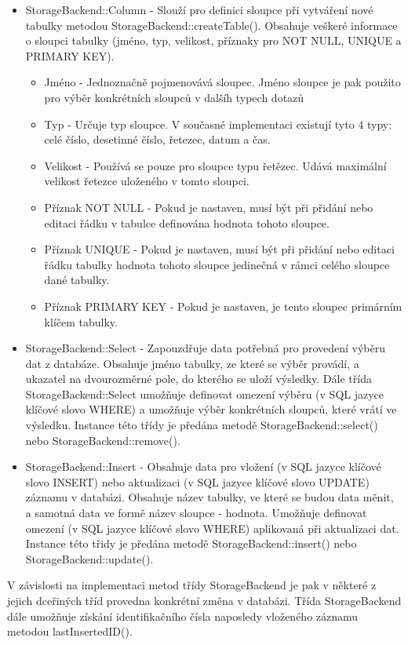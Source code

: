 \begin{itemize}
\item StorageBackend::Column - Slouží pro definici sloupce při vytváření nové tabulky metodou StorageBackend::createTable().
Obsahuje veškeré informace o sloupci tabulky (jméno, typ, velikost,
příznaky pro NOT NULL, UNIQUE a PRIMARY KEY). %
\begin{itemize}
\item Jméno - Jednoznačně pojmenovává sloupec. Jméno sloupce je pak použito pro výběr konkrétních sloupců v dalšíh typech
dotazů
\item Typ - Určuje typ sloupce. V současné implementaci existují tyto 4 typy: celé číslo, desetinné číslo, řetezec, datum a čas.
\item Velikost - Používá se pouze pro sloupce typu řetězec. Udává maximální velikost řetezce uloženého v tomto sloupci.
\item Příznak NOT NULL - Pokud je nastaven, musí být při přidání nebo editaci řádku v tabulce definována hodnota tohoto sloupce.
\item Příznak UNIQUE - Pokud je nastaven, musí být při přidání nebo editaci řádku tabulky hodnota tohoto sloupce jedinečná v rámci
celého sloupce dané tabulky.
\item Příznak PRIMARY KEY - Pokud je nastaven, je tento sloupec primárním klíčem tabulky.
\end{itemize}
\item StorageBackend::Select - Zapouzdřuje data potřebná pro provedení výběru dat z databáze. Obsahuje jméno tabulky,
ze které se výběr provádí, a ukazatel na dvourozměrné pole, do kterého se uloží
výsledky. Dále třída StorageBackend::Select umožňuje
definovat omezení výběru (v SQL jazyce klíčové slovo WHERE) a umožňuje výběr konkrétních sloupců, které vrátí ve výsledku.
Instance této třídy je předána metodě StorageBackend::select() nebo StorageBackend::remove().
\item StorageBackend::Insert - Obsahuje data pro vložení (v SQL jazyce klíčové
slovo INSERT) nebo aktualizaci (v SQL jazyce klíčové slovo UPDATE)
záznamu v databázi. Obsahuje název tabulky, ve které se budou data měnit, a samotná data ve formě název sloupce - hodnota.
Umožňuje definovat omezení (v SQL jazyce klíčové slovo WHERE) aplikovaná při aktualizaci dat. Instance této třidy je předána metodě
StorageBackend::insert() nebo StorageBackend::update().
\end{itemize}

V závislosti na implementaci metod třídy StorageBackend je pak v některé z
jejich dceřiných tříd provedna konkrétní změna v
databázi. Třída StorageBackend dále umožňuje získání identifikačního čísla naposledy vloženého záznamu metodou lastInsertedID().


